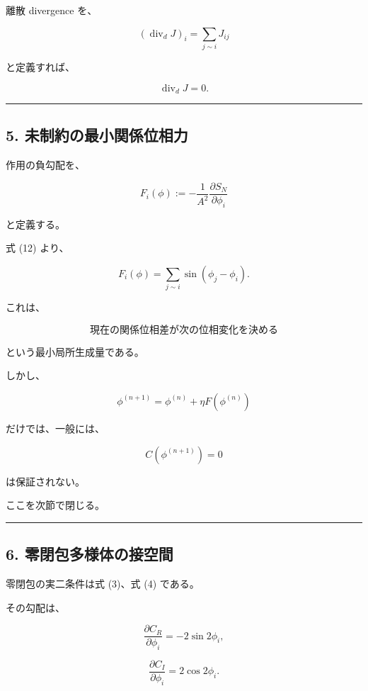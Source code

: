 \documentclass[
  a4paper,
]{ltjsarticle}
\begin{document}
離散 divergence を、

\[
\boxed{
(\operatorname{div}_dJ)_i
=
\sum_{j\sim i}J_{ij}
}
\tag{14}
\]

と定義すれば、

\[
\boxed{
\operatorname{div}_dJ=0.
}
\tag{15}
\]

\begin{center}\rule{0.5\linewidth}{0.5pt}\end{center}

\subsection{5.
未制約の最小関係位相力}\label{ux672aux5236ux7d04ux306eux6700ux5c0fux95a2ux4fc2ux4f4dux76f8ux529b}

作用の負勾配を、

\[
F_i(\phi)
:=
-\frac{1}{A^2}
\frac{\partial S_N}{\partial\phi_i}
\]

と定義する。

式 (12) より、

\[
\boxed{
F_i(\phi)
=
\sum_{j\sim i}
\sin(\phi_j-\phi_i).
}
\tag{16}
\]

これは、

\[
\boxed{
\text{現在の関係位相差が次の位相変化を決める}
}
\]

という最小局所生成量である。

しかし、

\[
\phi^{(n+1)}
=
\phi^{(n)}
+
\eta F(\phi^{(n)})
\]

だけでは、一般には、

\[
C(\phi^{(n+1)})=0
\]

は保証されない。

ここを次節で閉じる。

\begin{center}\rule{0.5\linewidth}{0.5pt}\end{center}

\subsection{6.
零閉包多様体の接空間}\label{ux96f6ux9589ux5305ux591aux69d8ux4f53ux306eux63a5ux7a7aux9593}

零閉包の実二条件は式 (3)、式 (4) である。

その勾配は、

\[
\frac{\partial C_R}{\partial\phi_i}
=
-2\sin2\phi_i,
\]

\[
\frac{\partial C_I}{\partial\phi_i}
=
2\cos2\phi_i.
\]
\end{document}
